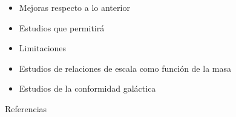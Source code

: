 \documentclass[xcolor=dvipsnames,4pt,hyperref={colorlinks,citecolor=black,linkcolor=black,urlcolor=black}]{beamer}
\begin{document}
\begin{frame}{}
%
\begin{itemize}
\item Mejoras respecto a lo anterior
\item Estudios que permitirá
\item Limitaciones
\end{itemize}
%
\end{frame}


\begin{frame}{}
%
\begin{itemize}
\item Estudios de relaciones de escala como función de la masa
\item Estudios de la conformidad galáctica
\end{itemize}
%
\end{frame}

\begin{frame}[allowframebreaks]{Referencias}
%
\printbibliography
\end{frame}
\end{document}
